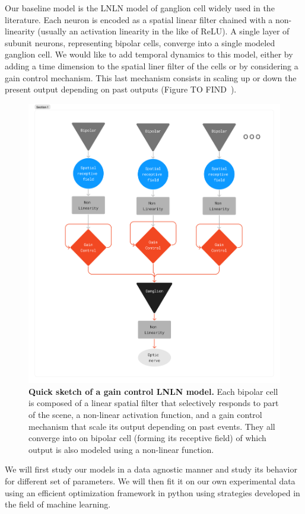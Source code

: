 Our baseline model is the LNLN model of ganglion cell widely used in the
literature. Each neuron is encoded as a spatial linear filter chained with a
non-linearity (usually an activation linearity in the like of ReLU). A single
layer of subunit neurons, representing bipolar cells, converge into a single
modeled ganglion cell.	We would like to add temporal dynamics to this model,
either by adding a time dimension to the spatial liner filter of the cells or
by considering a gain control mechanism. This last mechanism consists in
scaling up or down the present output depending on past outputs (Figure
TO FIND~\cite{}).

\begin{figure}
    \centering
    \includegraphics[scale = 0.2]{pics/GCModelDiagram.png}
    \caption{\textbf{Quick sketch of a gain control LNLN model.} Each bipolar
        cell is
        composed of a linear spatial filter that selectively responds to part
        of the scene,
        a non-linear activation function, and a gain control mechanism that
        scale its output
        depending on past events. They all converge into on bipolar cell
        (forming its receptive field)
        of which output is also modeled using a non-linear function.}
    \label{fig:LNLN}
\end{figure}
We will first study our models in a data agnostic manner and study its behavior
for different set of parameters. We will then fit it on our own experimental
data using an efficient optimization framework in python using strategies
developed in the field of machine learning.